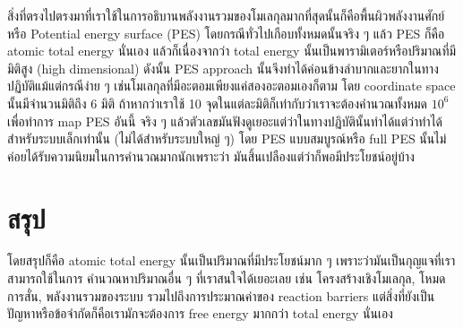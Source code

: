 สิ่งที่ตรงไปตรงมาที่เราใช้ในการอธิบานพลังงานรวมของโมเลกุลมากที่สุดนั้นก็คือพื้นผิวพลังงานศักย์หรือ Potential energy 
surface (PES) โดยกรณีทั่วไปเกือบทั้งหมดนั้นจริง ๆ แล้ว PES ก็คือ atomic total energy นั่นเอง 
แล้วก็เนื่องจากว่า total energy นั้นเป็นพารามิเตอร์หรือปริมาณที่มีมิติสูง (high dimensional) ดังนั้น PES approach 
นั้นจึงทำได้ค่อนข้างลำบากและยากในทางปฏิบัติแม้แต่กรณีง่าย ๆ เช่นโมเลกุลที่มีอะตอมเพียงแค่สองอะตอมเองก็ตาม 
โดย coordinate space นั้นมีจำนวนมิติถึง 6 มิติ ถ้าหากว่าเราใช้ 10 จุดในแต่ละมิติก็เท่ากับว่าเราจะต้องคำนวณทั้งหมด 
$10^{6}$ เพื่อทำการ map PES อันนี้ จริง ๆ แล้วตัวเลขมันฟังดูเยอะแต่ว่าในทางปฏิบัตินั้นทำได้แต่ว่าทำได้สำหรับระบบเล็กเท่านั้น 
(ไม่ได้สำหรับระบบใหญ่ ๆ) โดย PES แบบสมบูรณ์หรือ full PES นั้นไม่ค่อยได้รับความนิยมในการคำนวณมากนักเพราะว่า%
มันสิ้นเปลืองแต่ว่าก็พอมีประโยชน์อยู่บ้าง

\section{สรุป}

โดยสรุปก็คือ atomic total energy นั้นเป็นปริมาณที่มีประโยชน์มาก ๆ เพราะว่ามันเป็นกุญแจที่เราสามารถใช้ในการ%
คำนวณหาปริมาณอื่น ๆ ที่เราสนใจได้เยอะเลย เช่น โครงสร้างเชิงโมเลกุล, โหมดการสั่น, พลังงานรวมของระบบ 
รวมไปถึงการประมาณค่าของ reaction barriers แต่สิ่งที่ยังเป็นปัญหาหรือข้อจำกัดก็คือเรามักจะต้องการ free energy 
มากกว่า total energy นั่นเอง 
